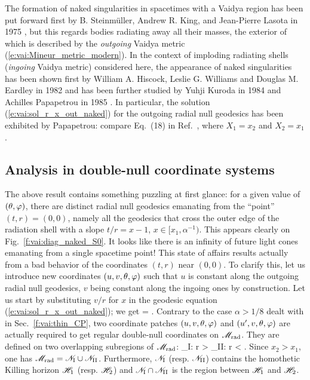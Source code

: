 \begin{hist}
The formation of naked singularities in spacetimes with a Vaidya region
has been put forward first by B. Steinmüller, Andrew R. King, and Jean-Pierre Lasota
in 1975 \cite{SteinmKL75}, but this regards bodies radiating away all their masses, the exterior of which
is described by the \emph{outgoing} Vaidya metric (\ref{e:vai:Mineur_metric_modern}).
In the context of imploding
radiating shells (\emph{ingoing} Vaidya metric) considered here, the appearance of naked singularities
has been shown first by William A. Hiscock, Leslie G. Williams and Douglas M. Eardley in 1982 \cite{HiscoWE82} and has been further studied by
Yuhji Kuroda in 1984 \cite{Kurod84} and Achilles Papapetrou in 1985 \cite{Papap85}. In particular, the solution (\ref{e:vai:sol_r_x_out_naked}) for the
outgoing radial null geodesics has been exhibited by Papapetrou: compare Eq.~(18) in Ref.~\cite{Papap85},
where $X_1=x_2$ and $X_2=x_1$.
\end{hist}

\subsection{Analysis in double-null coordinate systems} \label{s:vai:analysis_double_null}

The above result contains something puzzling at first glance: for a given
value of $(\theta,\varphi)$, there are distinct radial null geodesics emanating
from the ``point'' $(t, r) = (0,0)$, namely all the geodesics that
cross the outer edge of the radiation shell with a slope $t/r = x - 1$,
$x\in [x_1, \alpha^{-1})$. %
This appears clearly on Fig.~\ref{f:vai:diag_naked_S0}.
It looks like there is an infinity of future light cones emanating
from a single spacetime point!
This state of affairs results actually from a bad behavior of the coordinates
$(t, r)$ near $(0,0)$. To clarify this, let us introduce new coordinates
$(u, v, \theta, \varphi)$ such that $u$ is constant along the
outgoing radial null geodesics, $v$ being constant along
the ingoing ones by construction. Let us start by substituting $v/r$ for $x$ in
the geodesic equation (\ref{e:vai:sol_r_x_out_naked}); we get
\be \label{e:vai:v_r_out_naked}
     = .
\ee
Contrary to the case $\alpha > 1/8$ dealt with in Sec.~\ref{f:vai:thin_CP},
two coordinate patches $(u,v,\theta,\varphi)$ and $(u',v,\theta,\varphi)$ are actually
required to get regular double-null coordinates on $\mathscr{M}_{\rm rad}$. They are defined
on two overlapping subregions of $\mathscr{M}_{\rm rad}$:
\be \label{e:vai:def_NI_NII}
    _{\rm I}: r >  \qand
    _{\rm II}: r <  .
\ee
Since $x_2 > x_1$, one has
$\mathscr{M}_{\rm rad} = \mathscr{N}_{\rm I} \cup \mathscr{N}_{\rm II}$.
Furthermore, $\mathscr{N}_{\rm I}$ (resp.  $\mathscr{N}_{\rm II}$)
contains the homothetic Killing horizon $\mathscr{H}_1$ (resp. $\mathscr{H}_2$)
and $\mathscr{N}_{\rm I} \cap \mathscr{N}_{\rm II}$ is the region
between $\mathscr{H}_1$ and $\mathscr{H}_2$.

